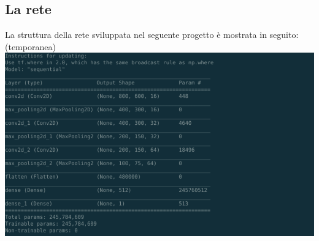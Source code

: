 \documentclass[14pt]{extarticle}
\begin{document}
\subsection{La rete}
La struttura della rete sviluppata nel seguente progetto è mostrata in seguito: (temporanea)\\
\includegraphics[scale=0.5]{Struttura-della_rete1.png}

\end{document}
